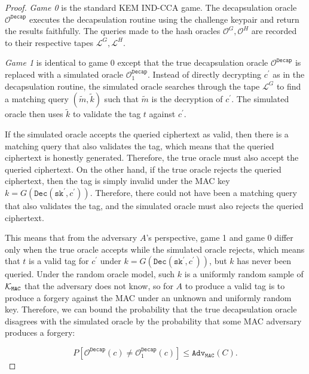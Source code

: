 \documentclass[letterpaper,12pt,titlepage,oneside,final]{book}
\newcommand{\decrypt}{\texttt{Dec}}
\newcommand{\decap}{\texttt{Decap}}
\newcommand{\mac}{\texttt{\texttt{MAC}}}
\newcommand{\sk}{\texttt{sk}}
\newcommand{\adv}{\texttt{Adv}}
\begin{document}
\begin{proof}
    \emph{Game 0} is the standard KEM IND-CCA game. 
    The decapsulation oracle $\mathcal{O}^\decap$ executes the decapsulation routine using the challenge keypair and return the results faithfully. 
    The queries made to the hash oracles $\mathcal{O}^G, \mathcal{O}^H$ are recorded to their respective tapes $\mathcal{L}^G, \mathcal{L}^H$.

    \emph{Game 1} is identical to game 0 except that the true decapsulation oracle $\mathcal{O}^\decap$ is replaced with a simulated oracle $\mathcal{O}^\decap_1$. Instead of directly decrypting $c^\prime$ as in the decapsulation routine, the simulated oracle searches through the tape $\mathcal{L}^G$ to find a matching query $(\tilde{m}, \tilde{k})$ such that $\tilde{m}$ is the decryption of $c^\prime$. The simulated oracle then uses $\tilde{k}$ to validate the tag $t$ against $c^\prime$.

    If the simulated oracle accepts the queried ciphertext as valid, then there is a matching query that also validates the tag, which means that the queried ciphertext is honestly generated. Therefore, the true oracle must also accept the queried ciphertext. On the other hand, if the true oracle rejects the queried ciphertext, then the tag is simply invalid under the MAC key $k = G(\decrypt(\sk^\prime, c^\prime))$. Therefore, there could not have been a matching query that also validates the tag, and the simulated oracle must also rejects the queried ciphertext.

    This means that from the adversary $A$'s perspective, game 1 and game 0 differ only when the true oracle accepts while the simulated oracle rejects, which means that $t$ is a valid tag for $c^\prime$ under $k = G(\decrypt(\sk^\prime, c^\prime))$, but $k$ has never been queried. 
    Under the random oracle model, such $k$ is a uniformly random sample of $\mathcal{K}_\mac$ that the adversary does not know, so for $A$ to produce a valid tag is to produce a forgery against the MAC under an unknown and uniformly random key. 
    Therefore, we can bound the probability that the true decapsulation oracle disagrees with the simulated oracle by the probability that some MAC adversary produces a forgery:

    \begin{equation*}
        P\left[\mathcal{O}^\decap(c) \neq \mathcal{O}^\decap_1(c)\right]
        \leq \adv_\texttt{MAC}(C).
    \end{equation*}


\end{proof}
\end{document}
